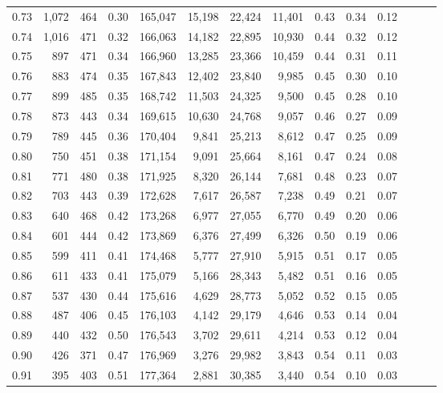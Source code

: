 \begin{tabular}{rrrrrrrrrrrrrr}
0.73 &  1,072 &    464 &  0.30 &  165,047 &   15,198 &  22,424 &  11,401 &  0.43 &  0.34 &      0.12 \\
0.74 &  1,016 &    471 &  0.32 &  166,063 &   14,182 &  22,895 &  10,930 &  0.44 &  0.32 &      0.12 \\
0.75 &    897 &    471 &  0.34 &  166,960 &   13,285 &  23,366 &  10,459 &  0.44 &  0.31 &      0.11 \\
0.76 &    883 &    474 &  0.35 &  167,843 &   12,402 &  23,840 &   9,985 &  0.45 &  0.30 &      0.10 \\
0.77 &    899 &    485 &  0.35 &  168,742 &   11,503 &  24,325 &   9,500 &  0.45 &  0.28 &      0.10 \\
0.78 &    873 &    443 &  0.34 &  169,615 &   10,630 &  24,768 &   9,057 &  0.46 &  0.27 &      0.09 \\
0.79 &    789 &    445 &  0.36 &  170,404 &    9,841 &  25,213 &   8,612 &  0.47 &  0.25 &      0.09 \\
0.80 &    750 &    451 &  0.38 &  171,154 &    9,091 &  25,664 &   8,161 &  0.47 &  0.24 &      0.08 \\
0.81 &    771 &    480 &  0.38 &  171,925 &    8,320 &  26,144 &   7,681 &  0.48 &  0.23 &      0.07 \\
0.82 &    703 &    443 &  0.39 &  172,628 &    7,617 &  26,587 &   7,238 &  0.49 &  0.21 &      0.07 \\
0.83 &    640 &    468 &  0.42 &  173,268 &    6,977 &  27,055 &   6,770 &  0.49 &  0.20 &      0.06 \\
0.84 &    601 &    444 &  0.42 &  173,869 &    6,376 &  27,499 &   6,326 &  0.50 &  0.19 &      0.06 \\
0.85 &    599 &    411 &  0.41 &  174,468 &    5,777 &  27,910 &   5,915 &  0.51 &  0.17 &      0.05 \\
0.86 &    611 &    433 &  0.41 &  175,079 &    5,166 &  28,343 &   5,482 &  0.51 &  0.16 &      0.05 \\
0.87 &    537 &    430 &  0.44 &  175,616 &    4,629 &  28,773 &   5,052 &  0.52 &  0.15 &      0.05 \\
0.88 &    487 &    406 &  0.45 &  176,103 &    4,142 &  29,179 &   4,646 &  0.53 &  0.14 &      0.04 \\
0.89 &    440 &    432 &  0.50 &  176,543 &    3,702 &  29,611 &   4,214 &  0.53 &  0.12 &      0.04 \\
0.90 &    426 &    371 &  0.47 &  176,969 &    3,276 &  29,982 &   3,843 &  0.54 &  0.11 &      0.03 \\
0.91 &    395 &    403 &  0.51 &  177,364 &    2,881 &  30,385 &   3,440 &  0.54 &  0.10 &      0.03 \\

\end{tabular}
